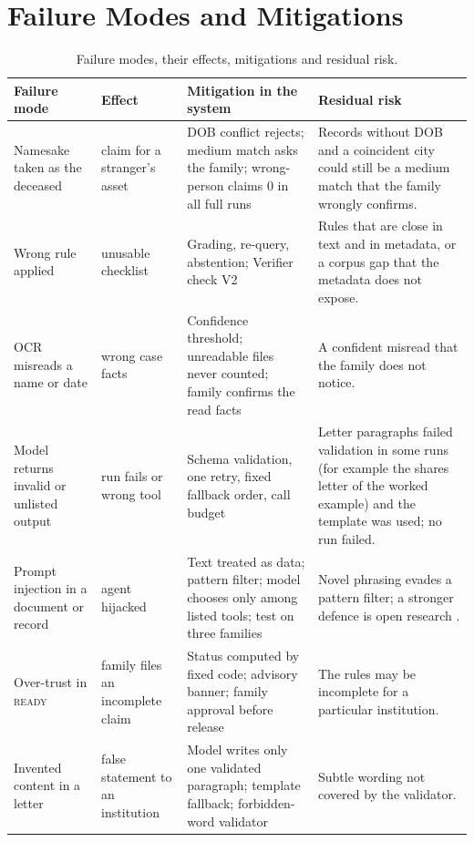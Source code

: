 \section{Failure Modes and Mitigations}
\begin{table}[H]
\centering\footnotesize{}
\caption[Failure modes and mitigations]{Failure modes, their effects, mitigations and residual risk.}\label{tab:fmea}
\renewcommand{\arraystretch}{1.1}
\begin{tabularx}{\linewidth}{@{}p{2.5cm}p{2.7cm}p{3.7cm}X@{}}
\toprule
\textbf{Failure mode} & \textbf{Effect} & \textbf{Mitigation in the system} & \textbf{Residual risk} \\ \midrule
Namesake taken as the deceased & claim for a stranger's asset & DOB conflict rejects; medium match asks the family; wrong-person claims 0 in all full runs & Records without DOB and a coincident city could still be a medium match that the family wrongly confirms. \\
Wrong rule applied & unusable checklist & Grading, re-query, abstention; Verifier check V2 & Rules that are close in text and in metadata, or a corpus gap that the metadata does not expose. \\
OCR misreads a name or date & wrong case facts & Confidence threshold; unreadable files never counted; family confirms the read facts & A confident misread that the family does not notice. \\
Model returns invalid or unlisted output & run fails or wrong tool & Schema validation, one retry, fixed fallback order, call budget & Letter paragraphs failed validation in some runs (for example the shares letter of the worked example) and the template was used; no run failed. \\
Prompt injection in a document or record & agent hijacked & Text treated as data; pattern filter; model chooses only among listed tools; test on three families & Novel phrasing evades a pattern filter; a stronger defence is open research \cite{greshake2023}. \\
Over-trust in \textsc{ready} & family files an incomplete claim & Status computed by fixed code; advisory banner; family approval before release & The rules may be incomplete for a particular institution. \\
Invented content in a letter & false statement to an institution & Model writes only one validated paragraph; template fallback; forbidden-word validator & Subtle wording not covered by the validator. \\
\bottomrule
\end{tabularx}
\end{table}

